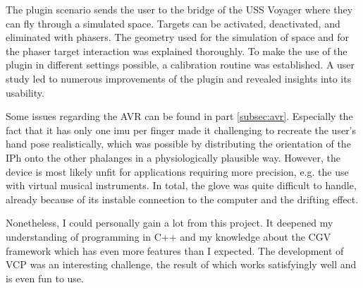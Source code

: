 \documentclass[hyperref, bachelorofscience]{cgvpub}
\begin{document}
The plugin scenario sends the user to the bridge of the USS Voyager where they can fly through a simulated space. Targets can be activated, deactivated, and eliminated with phasers. The geometry used for the simulation of space and for the phaser target interaction was explained thoroughly. To make the use of the plugin in different settings possible, a calibration routine was established. A user study led to numerous improvements of the plugin and revealed insights into its usability.

Some issues regarding the \Gls{AVR} can be found in part \ref{subsec:avr}. Especially the fact that it has only one \acrshort{imu} per finger made it challenging to recreate the user's hand pose realistically, which was possible by distributing the orientation of the \gls{IPh} onto the other phalanges in a physiologically plausible way. However, the device is most likely unfit for applications requiring more precision, e.g. the use with virtual musical instruments. In total, the glove was quite difficult to handle, already because of its instable connection to the computer and the drifting effect. 

Nonetheless, I could personally gain a lot from this project. It deepened my understanding of programming in C++ and my knowledge about the \gls{CGV} framework which has even more features than I expected. The development of \gls{VCP} was an interesting challenge, the result of which works satisfyingly well and is even fun to use.

\printglossary[type=gloss_terms]
\printglossary[type=gloss_acr]
\end{document}
